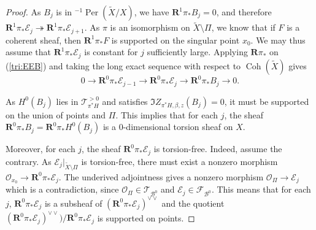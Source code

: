 \documentclass[12pt]{amsart}
\theoremstyle{definition}
\DeclareMathOperator{\Coh}{Coh}
\DeclareMathOperator{\Per}{Per}
\begin{document}
\begin{proof}
As $B_j$ is in ${^{-1}\Per}(\widetilde{X}/X)$,
we have $\mathbf{R}^1\pi_\ast B_j=0$,
and therefore $\mathbf{R}^1\pi_\ast \mathcal{E}_j \twoheadrightarrow \mathbf{R}^1\pi_\ast \mathcal{E}_{j+1}$.
As $\pi$ is an isomorphism on $\widetilde{X} \setminus \Pi$, we know that if $F$ is a coherent sheaf, 
then $\mathbf{R}^1\pi_\ast F$ is supported on the singular point $x_0$.
We may thus assume that $\mathbf{R}^1\pi_\ast \mathcal{E}_j$ is constant for $j$ sufficiently large.
Applying $\mathbf{R}\pi_\ast$ on (\ref{tri:EEB}) and taking the long exact sequence  with respect to $\Coh(\widetilde{X})$ gives 
\begin{equation}\label{ses:REEB}
0 \longrightarrow \mathbf{R}^0\pi_\ast \mathcal{E}_{j-1} \longrightarrow \mathbf{R}^0\pi_\ast\mathcal{E}_j \longrightarrow \mathbf{R}^0\pi_\ast B_j  \longrightarrow 0.
\end{equation}

As $H^0(B_j)$ lies in $\mathcal{T}^{>0}_{\pi^\ast H}$ and satisfies $\Im Z_{\pi^\ast H,\beta,z}(B_j)=0$, it must be supported on the union of points and $\Pi$.
This implies that for each $j$, the sheaf $\mathbf{R}^0\pi_\ast B_j = \mathbf{R}^0\pi_\ast H^0(B_j)$ is a $0$-dimensional torsion sheaf on $X$.

Moreover, for each $j$, the sheaf $\mathbf{R}^0\pi_\ast\mathcal{E}_j$ is torsion-free.
Indeed, assume the contrary. As $\mathcal{E}_j|_{\widetilde{X}\setminus \Pi}$ is torsion-free,
there must exist a nonzero morphism $ \mathcal{O}_{x_0} \longrightarrow \mathbf{R}^0\pi_\ast\mathcal{E}_j$.
The underived adjointness gives a nonzero morphism $\mathcal{O}_\Pi \longrightarrow \mathcal{E}_j$ which is a contradiction, 
since $\mathcal{O}_\Pi \in \mathcal{T}_{\mathcal{B}^0}$ and $\mathcal{E}_j \in \mathcal{F}_{\mathcal{B}^0}$.
This means that for each $j$, $\mathbf{R}^0\pi_\ast\mathcal{E}_j$ is a subsheaf of $(\mathbf{R}^0\pi_\ast\mathcal{E}_j)^{\vee\vee}$ and the quotient $(\mathbf{R}^0\pi_\ast\mathcal{E}_j)^{\vee\vee})/\mathbf{R}^0\pi_\ast\mathcal{E}_j$ is supported on points.




\end{proof}
\end{document}
